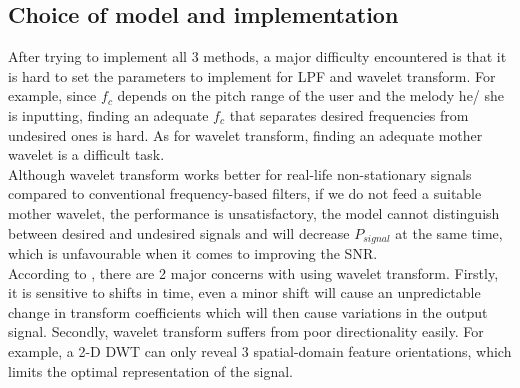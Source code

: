 \subsection{Choice of model and implementation}
After trying to implement all 3 methods, a major difficulty encountered is that it is hard to set the parameters to 
implement for LPF and wavelet transform.
For example, since $f_c$ depends on the pitch range of the user and the melody he/ she
is inputting, finding an adequate $f_c$ that separates desired frequencies from undesired ones is hard.
As for wavelet transform, finding an adequate mother wavelet is a difficult task.\\
Although wavelet transform works better for real-life non-stationary signals compared to conventional frequency-based filters, if we
do not feed a suitable mother wavelet, the performance is unsatisfactory, the model cannot distinguish between desired and undesired 
signals and will decrease $P_{signal}$ at the same time, which is unfavourable when it comes to improving the SNR.\\
According to \cite{complexwt}, there are 2 major concerns with using wavelet transform. 
Firstly, it is sensitive to shifts in time, even a minor shift will cause an unpredictable change in transform coefficients which will 
then cause variations in the output signal. Secondly, wavelet transform suffers from poor directionality easily. For example, 
a 2-D DWT can only reveal 3 spatial-domain feature orientations, which limits the optimal representation of the signal. 

